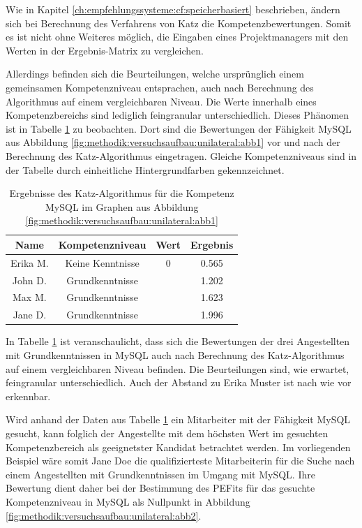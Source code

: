 Wie in Kapitel \ref{ch:empfehlungssysteme:cf:speicherbasiert} beschrieben, ändern sich bei Berechnung des Verfahrens von Katz die Kompetenzbewertungen. Somit es ist nicht ohne Weiteres möglich, die Eingaben eines Projektmanagers mit den Werten in der Ergebnis-Matrix zu vergleichen.

Allerdings befinden sich die Beurteilungen, welche ursprünglich einem gemeinsamen Kompetenzniveau entsprachen, auch nach Berechnung des Algorithmus auf einem vergleichbaren Niveau. Die Werte innerhalb eines Kompetenzbereichs sind lediglich feingranular unterschiedlich. Dieses Phänomen ist in Tabelle \ref{tbl:methodik:versuchsaufbau:unilateral:tbl1} zu beobachten. Dort sind die Bewertungen der Fähigkeit MySQL aus Abbildung \ref{fig:methodik:versuchsaufbau:unilateral:abb1} vor und nach der Berechnung des Katz-Algorithmus eingetragen. Gleiche Kompetenzniveaus sind in der Tabelle durch einheitliche Hintergrundfarben gekennzeichnet.

\begin{table}[h]
	\centering
	\begin{tabular}{c|c|c|c}
		Name & Kompetenzniveau & Wert & Ergebnis \\
		\hline
		 \rowcolor{exxetagray}Erika M. & Keine Kenntnisse & 0                  & 0.565\\
		\hline
		\rowcolor{itemcolor}John D.    & Grundkenntnisse  & \kantengewicht     & 1.202\\
		\rowcolor{itemcolor}Max M.     & Grundkenntnisse  & \kantengewicht     & 1.623\\
		\rowcolor{itemcolor}Jane D.    & Grundkenntnisse  & \kantengewicht     & 1.996
	\end{tabular}
	\caption{Ergebnisse des Katz-Algorithmus für die Kompetenz MySQL im Graphen aus Abbildung \ref{fig:methodik:versuchsaufbau:unilateral:abb1}}
	\label{tbl:methodik:versuchsaufbau:unilateral:tbl1}
\end{table}

In Tabelle \ref{tbl:methodik:versuchsaufbau:unilateral:tbl1} ist veranschaulicht, dass sich die Bewertungen der drei Angestellten mit Grundkenntnissen in MySQL auch nach Berechnung des Katz-Algorithmus auf einem vergleichbaren Niveau befinden. Die Beurteilungen sind, wie erwartet, feingranular unterschiedlich. Auch der Abstand zu Erika Muster ist nach wie vor erkennbar.

Wird anhand der Daten aus Tabelle \ref{tbl:methodik:versuchsaufbau:unilateral:tbl1} ein Mitarbeiter mit der Fähigkeit MySQL gesucht, kann folglich der Angestellte mit dem höchsten Wert im gesuchten Kompetenzbereich als geeignetster Kandidat betrachtet werden. Im vorliegenden Beispiel wäre somit Jane Doe die qualifizierteste Mitarbeiterin für die Suche nach einem Angestellten mit Grundkenntnissen im Umgang mit MySQL. Ihre Bewertung dient daher bei der Bestimmung des \acp{PEFit} für das gesuchte Kompetenzniveau in MySQL als Nullpunkt in Abbildung \ref{fig:methodik:versuchsaufbau:unilateral:abb2}.

